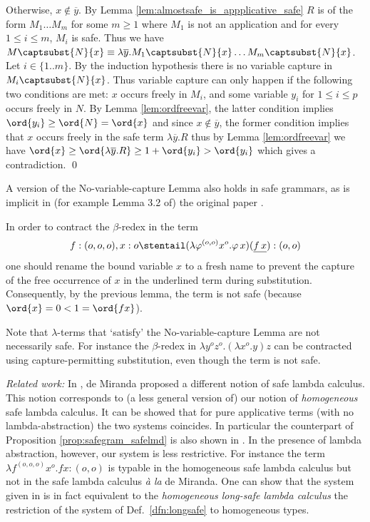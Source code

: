  Otherwise, $x \not\in \overline{y}$. By Lemma \ref{lem:almostsafe_is_appplicative_safe} $R$ is of the
  form $M_1 \ldots M_m$ for some $m\geq 1$ where $M_1$ is not an application and for every $1 \leq i\leq m$, $M_i$ is safe.
 Thus we have $M \captsubst{N}{x} \equiv \lambda \overline{y} . M_1 \captsubst{N}{x} \ldots M_m \captsubst{N}{x}$.  Let $i\in\{1..m\}$. By the induction hypothesis there is no variable capture in $M_i \captsubst{N}{x}$.  Thus variable capture can only happen if the following two conditions are met: $x$ occurs freely in $M_i$, and some variable $y_i$ for $1 \leq i \leq p$ occurs freely in $N$. By Lemma \ref{lem:ordfreevar}, the latter condition implies $\ord{y_i} \geq \ord{N} = \ord{x}$ and  since $x \not \in \overline{y}$, the former condition implies that $x$ occurs freely in the safe term $\lambda \overline{y}. R$
  thus by Lemma \ref{lem:ordfreevar} we have $ \ord{x} \geq
  \ord{\lambda \overline{y} . R} \geq 1+ \ord{y_i} > \ord{y_i}$ which  gives a contradiction.
\qed


\begin{remark}
  A version of the No-variable-capture Lemma also holds in safe
  grammars, as is implicit in (for example Lemma 3.2 of) the original
  paper \cite{KNU02}.
\end{remark}

\begin{example}
  In order to contract the $\beta$-redex in the term
\[f:(o,o,o),x:o
  \stentail (\lambda \varphi^{(o,o)} x^o . \varphi \, x) (\underline{f \,
    x}) : (o,o)\] one should rename the bound variable $x$ to a fresh name to
  prevent the capture of the free occurrence of $x$ in the underlined term during substitution. Consequently, by the previous lemma,
  the term is not safe (because $\ord{x} = 0 < 1
  = \ord{f x}$).
\end{example}

Note that $\lambda$-terms that `satisfy' the No-variable-capture
Lemma are not necessarily safe. For instance the $\beta$-redex in
$\lambda y^o z^o. (\lambda x^o .y) z$ can be contracted using
capture-permitting substitution, even though the term is not safe.
\bigskip

\emph{Related work:} In \cite{demirandathesis}, de Miranda proposed a different notion of safe lambda calculus. This notion corresponds to (a less general version of) our notion of \emph{homogeneous} safe lambda calculus. It can be showed that for pure applicative terms (\ie with no lambda-abstraction) the two systems coincides. In particular the counterpart of Proposition \ref{prop:safegram_safelmd} is also shown in \cite{demirandathesis}. In the presence of lambda abstraction, however, our system is less restrictive. For instance the term $\lambda f^{(o,o,o)} x^o.  f x : (o,o)$ is typable in the homogeneous safe lambda calculus but not in the safe lambda calculus \emph{\`a la} de Miranda. One can show that the system given in \cite{demirandathesis} is in fact equivalent to the \emph{homogeneous long-safe lambda calculus} \ie the restriction of the system of Def.\ \ref{dfn:longsafe} to homogeneous types.

